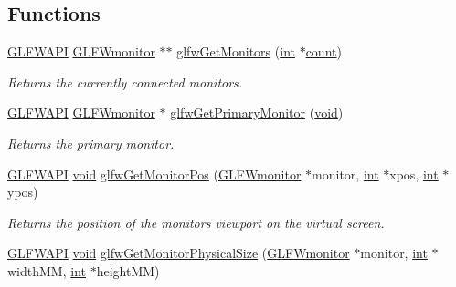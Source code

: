 \subsection*{Functions}
\begin{DoxyCompactItemize}
\item 
\hyperlink{glfw3_8h_a56da5036b2cc259351ae22fd6439bb47}{G\+L\+F\+W\+A\+P\+I} \hyperlink{group__monitor_ga8d9efd1cde9426692c73fe40437d0ae3}{G\+L\+F\+Wmonitor} $\ast$$\ast$ \hyperlink{group__monitor_gab4d483284c57e28837bc2cd9639e9665}{glfw\+Get\+Monitors} (\hyperlink{wglew_8h_a500a82aecba06f4550f6849b8099ca21}{int} $\ast$\hyperlink{glew_8h_a10b284d589000663becfbc6867a3a9f7}{count})
\begin{DoxyCompactList}\small\item\em Returns the currently connected monitors. \end{DoxyCompactList}\item 
\hyperlink{glfw3_8h_a56da5036b2cc259351ae22fd6439bb47}{G\+L\+F\+W\+A\+P\+I} \hyperlink{group__monitor_ga8d9efd1cde9426692c73fe40437d0ae3}{G\+L\+F\+Wmonitor} $\ast$ \hyperlink{group__monitor_ga59ea49f377fe701dd76764183e64d9f4}{glfw\+Get\+Primary\+Monitor} (\hyperlink{wglew_8h_aeea6e3dfae3acf232096f57d2d57f084}{void})
\begin{DoxyCompactList}\small\item\em Returns the primary monitor. \end{DoxyCompactList}\item 
\hyperlink{glfw3_8h_a56da5036b2cc259351ae22fd6439bb47}{G\+L\+F\+W\+A\+P\+I} \hyperlink{wglew_8h_aeea6e3dfae3acf232096f57d2d57f084}{void} \hyperlink{group__monitor_ga45b5481a614ad7beb2aade9746d07563}{glfw\+Get\+Monitor\+Pos} (\hyperlink{group__monitor_ga8d9efd1cde9426692c73fe40437d0ae3}{G\+L\+F\+Wmonitor} $\ast$monitor, \hyperlink{wglew_8h_a500a82aecba06f4550f6849b8099ca21}{int} $\ast$xpos, \hyperlink{wglew_8h_a500a82aecba06f4550f6849b8099ca21}{int} $\ast$ypos)
\begin{DoxyCompactList}\small\item\em Returns the position of the monitor\textquotesingle{}s viewport on the virtual screen. \end{DoxyCompactList}\item 
\hyperlink{glfw3_8h_a56da5036b2cc259351ae22fd6439bb47}{G\+L\+F\+W\+A\+P\+I} \hyperlink{wglew_8h_aeea6e3dfae3acf232096f57d2d57f084}{void} \hyperlink{group__monitor_gad0e93a9e42b32394369cabbbdc1ab702}{glfw\+Get\+Monitor\+Physical\+Size} (\hyperlink{group__monitor_ga8d9efd1cde9426692c73fe40437d0ae3}{G\+L\+F\+Wmonitor} $\ast$monitor, \hyperlink{wglew_8h_a500a82aecba06f4550f6849b8099ca21}{int} $\ast$width\+M\+M, \hyperlink{wglew_8h_a500a82aecba06f4550f6849b8099ca21}{int} $\ast$height\+M\+M)
$$
\end{DoxyCompactItemize}
